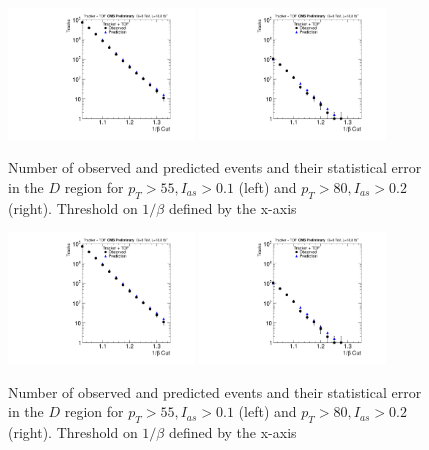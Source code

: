\begin{figure}
\begin{center}
\includegraphics[clip=true, trim=0.0cm 0cm 3.0cm 0cm, width=0.44\textwidth]{figures/tkmu/Pred_I010_Pt55_Data8TeV}
\includegraphics[clip=true, trim=0.0cm 0cm 3.0cm 0cm, width=0.44\textwidth]{figures/tkmu/Pred_I020_Pt80_Data8TeV}
\caption{Number of observed and predicted events and their statistical error in the $D$ region for $p_T>55, I_{as}>0.1$ (left)
and $p_T>80, I_{as}>0.2$ (right). Threshold on $1/\beta$ defined by the x-axis
\label{fig:ReachLimitRatio}}
\end{center}
\end{figure}

\begin{figure}
\begin{center}
\includegraphics[clip=true, trim=0.0cm 0cm 3.0cm 0cm, width=0.44\textwidth]{figures/tkmu/Pred_I010_Pt55_Data8TeV}
\includegraphics[clip=true, trim=0.0cm 0cm 3.0cm 0cm, width=0.44\textwidth]{figures/tkmu/Pred_I020_Pt80_Data8TeV}
\caption{Number of observed and predicted events and their statistical error in the $D$ region for $p_T>55, I_{as}>0.1$ (left)
and $p_T>80, I_{as}>0.2$ (right). Threshold on $1/\beta$ defined by the x-axis
\label{fig:LimitReachRatio}}
\end{center}
\end{figure}

